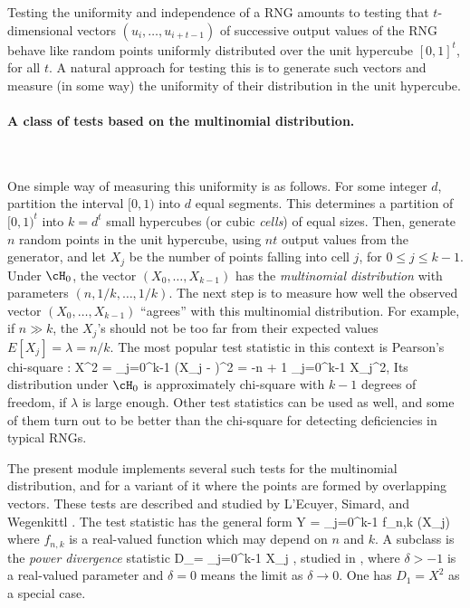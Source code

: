 
Testing the uniformity and independence of a RNG amounts to testing
that $t$-dimensional vectors $(u_i,\dots,u_{i+t-1})$ of successive 
output values of the RNG behave like random points uniformly distributed
over the unit hypercube $[0,1]^t$, for all $t$.
A natural approach for testing this is to generate such vectors and measure
(in some way) the uniformity of their distribution in the unit hypercube.

\paragraph*{A class of tests based on the multinomial distribution.} \

One simple way of measuring this uniformity is as follows.
For some integer $d$, partition the interval $[0,1)$ into $d$ equal
segments.  This determines a partition of $[0,1)^t$ into $k = d^t$
small hypercubes (or cubic {\em cells\/}) of equal sizes.
Then, generate $n$ random points in the unit hypercube, using $nt$
output values from the generator, and let $X_j$ be the number of 
points falling into cell $j$, for $0\le j\le k-1$.
Under $\cH_0$, the vector $(X_0,\dots,X_{k-1})$ has the 
{\em multinomial distribution\/} with parameters $(n,1/k,\dots,1/k)$.
The next step is to measure how well the observed vector 
$(X_0,\dots,X_{k-1})$ ``agrees'' with this multinomial distribution.
For example, if $n \gg k$, the $X_j$'s should not be too far from
their expected values $E[X_j] = \lambda = n/k$.
The most popular test statistic in this context is Pearson's 
chi-square \cite{rKNU98a,sLAW91a,tREA88a}:
\eq 
  X^2 = \sum_{j=0}^{k-1} {(X_j - \lambda)^2 \over \lambda} 
      = -n + {1\over\lambda} \sum_{j=0}^{k-1} X_j^2,
                                                       \label {eq:X2} 
\endeq 
Its distribution under $\cH_0$ is approximately 
chi-square with $k-1$ degrees of freedom, if $\lambda$ is large enough.
Other test statistics can be used as well, and some of
them turn out to be better than the chi-square for detecting 
deficiencies in typical RNGs.

The present module implements several such tests for the 
multinomial distribution, and for a variant of it where the points
are formed by overlapping vectors.
These tests are described and studied by 
L'Ecuyer, Simard, and Wegenkittl \cite{rLEC02c}.
The test statistic has the general form
\eq
  Y = \sum_{j=0}^{k-1} f_{n,k} (X_j)                   \label{eq:Y}
\endeq
where $f_{n,k}$ is a real-valued function which may depend on $n$ and $k$.
A subclass is the {\em power divergence\/} statistic 
\eq
  D_\delta = \sum_{j=0}^{k-1} {} X_j
    ,   \label{eq:Ddelta}
\endeq
studied in \cite{tREA88a},
where $\delta > -1$ is a real-valued parameter and
$\delta=0$ means the limit as $\delta\to 0$.
One has $D_1 = X^2$ as a special case.

